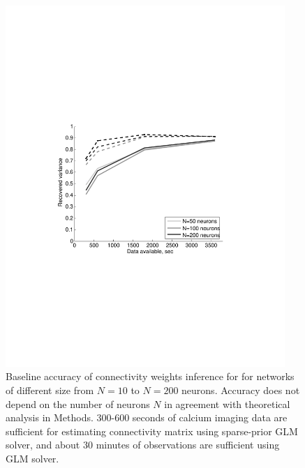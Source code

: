 \begin{figure}
\includegraphics[width=300pt]{../figs/Figure6c_perf_vs_N}
\caption{Baseline accuracy of connectivity weights inference for
for networks of different size from $N=10$ to $N=200$ neurons.
Accuracy does not depend on the number of neurons $N$ in agreement with theoretical analysis in Methods. 300-600 seconds of calcium imaging data are sufficient for estimating connectivity matrix using sparse-prior GLM solver, and about 30 minutes of observations are sufficient using GLM solver.}
\label{fig:data-n}
\end{figure}

